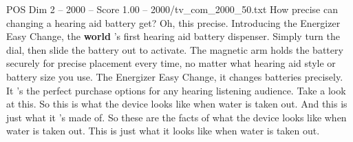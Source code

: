 \begin{textsample}{POS Dim 2 – 2000 – Score 1.00 – 2000/tv\_com\_2000\_50.txt}  \label{ex:f2_pos_086}
How precise can changing a hearing aid battery get?
Oh, this precise.
Introducing the Energizer Easy Change, the \textbf{world} 's first hearing aid battery dispenser.
Simply turn the dial, then slide the battery out to activate.
The magnetic arm holds the battery securely for precise placement every time, no matter what hearing aid style or battery size you use.
The Energizer Easy Change, it changes batteries precisely.
It 's the perfect purchase options for any hearing listening audience.
Take a look at this.
So this is what the device looks like when water is taken out.
And this is just what it 's made of.
So these are the facts of what the device looks like when water is taken out.
This is just what it looks like when water is taken out.

\end{textsample}
